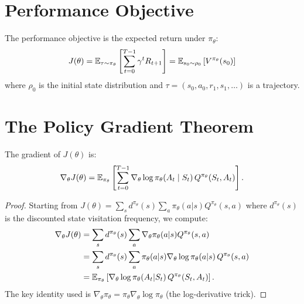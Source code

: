 \section{Performance Objective}
\label{sec:pg:objective}

\begin{definition}
The performance objective is the expected return under $\pi_\theta$:
\[
    J(\theta) = \mathbb{E}_{\tau \sim \pi_\theta}\left[
    \sum_{t=0}^{T-1} \gamma^t R_{t+1}\right]
    = \mathbb{E}_{s_0 \sim \rho_0}\left[V^{\pi_\theta}(s_0)\right]
\]
where $\rho_0$ is the initial state distribution and
$\tau = (s_0, a_0, r_1, s_1, \ldots)$ is a trajectory.
\end{definition}

\section{The Policy Gradient Theorem}
\label{sec:pg:theorem}

\begin{theorem}
\label{thm:policy_gradient}
The gradient of $J(\theta)$ is:
\[
    \nabla_\theta J(\theta) = \mathbb{E}_{\pi_\theta}\left[
    \sum_{t=0}^{T-1} \nabla_\theta \log \pi_\theta(A_t \mid S_t) \,
    Q^{\pi_\theta}(S_t, A_t) \right].
\]
\end{theorem}

\begin{proof}
Starting from $J(\theta) = \sum_s d^{\pi_\theta}(s)
\sum_a \pi_\theta(a|s) Q^{\pi_\theta}(s,a)$ where $d^{\pi_\theta}(s)$
is the discounted state visitation frequency, we compute:
\begin{align*}
    \nabla_\theta J(\theta)
    &= \sum_s d^{\pi_\theta}(s) \sum_a \nabla_\theta \pi_\theta(a|s)
       Q^{\pi_\theta}(s,a) \\
    &= \sum_s d^{\pi_\theta}(s) \sum_a \pi_\theta(a|s)
       \nabla_\theta \log \pi_\theta(a|s) \, Q^{\pi_\theta}(s,a) \\
    &= \mathbb{E}_{\pi_\theta}\left[\nabla_\theta \log \pi_\theta(A_t|S_t)
       \, Q^{\pi_\theta}(S_t, A_t)\right].
\end{align*}
The key identity used is
$\nabla_\theta \pi_\theta = \pi_\theta \nabla_\theta \log \pi_\theta$
(the log-derivative trick).
\end{proof}

